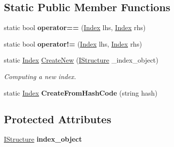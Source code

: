 \subsection*{Static Public Member Functions}
\begin{DoxyCompactItemize}
\item 
\hypertarget{class_dwarf_d_b_1_1_data_structures_1_1_index_aa332f812fd66a7516a1749a6c29a04c6}{
static bool {\bfseries operator==} (\hyperlink{class_dwarf_d_b_1_1_data_structures_1_1_index}{Index} lhs, \hyperlink{class_dwarf_d_b_1_1_data_structures_1_1_index}{Index} rhs)}
\label{class_dwarf_d_b_1_1_data_structures_1_1_index_aa332f812fd66a7516a1749a6c29a04c6}

\item 
\hypertarget{class_dwarf_d_b_1_1_data_structures_1_1_index_a58d657c3d8d9fd9d122d59bf55008495}{
static bool {\bfseries operator!=} (\hyperlink{class_dwarf_d_b_1_1_data_structures_1_1_index}{Index} lhs, \hyperlink{class_dwarf_d_b_1_1_data_structures_1_1_index}{Index} rhs)}
\label{class_dwarf_d_b_1_1_data_structures_1_1_index_a58d657c3d8d9fd9d122d59bf55008495}

\item 
static \hyperlink{class_dwarf_d_b_1_1_data_structures_1_1_index}{Index} \hyperlink{class_dwarf_d_b_1_1_data_structures_1_1_index_a8e14d93c580e2aadd133afeef416e44a}{CreateNew} (\hyperlink{interface_dwarf_d_b_1_1_data_structures_1_1_i_structure}{IStructure} \_\-index\_\-object)
\begin{DoxyCompactList}\small\item\em Computing a new index. \item\end{DoxyCompactList}\item 
\hypertarget{class_dwarf_d_b_1_1_data_structures_1_1_index_affa4776e5dd06a160e8a874b0f64d769}{
static \hyperlink{class_dwarf_d_b_1_1_data_structures_1_1_index}{Index} {\bfseries CreateFromHashCode} (string hash)}
\label{class_dwarf_d_b_1_1_data_structures_1_1_index_affa4776e5dd06a160e8a874b0f64d769}

\end{DoxyCompactItemize}
\subsection*{Protected Attributes}
\begin{DoxyCompactItemize}
\item 
\hypertarget{class_dwarf_d_b_1_1_data_structures_1_1_index_a028b92bd2f8012fe81b60d0fbac93044}{
\hyperlink{interface_dwarf_d_b_1_1_data_structures_1_1_i_structure}{IStructure} {\bfseries index\_\-object}}
\label{class_dwarf_d_b_1_1_data_structures_1_1_index_a028b92bd2f8012fe81b60d0fbac93044}

\end{DoxyCompactItemize}

